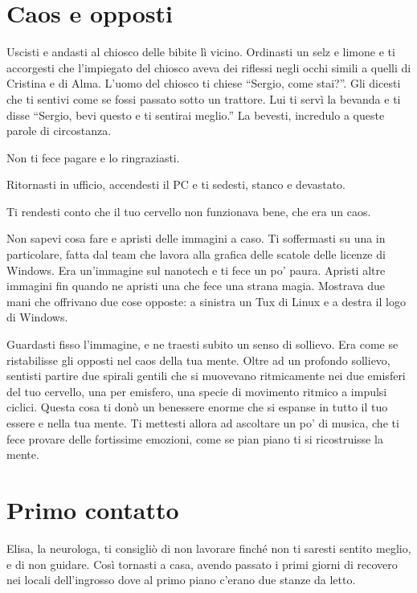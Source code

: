 \section{Caos e opposti}
\label{caos_e_opposti}

Uscisti e andasti al chiosco delle bibite lì vicino. Ordinasti un selz e limone e ti accorgesti che l'impiegato del chiosco aveva dei riflessi negli occhi simili a quelli di Cristina e di Alma. L'uomo del chiosco ti chiese “Sergio, come stai?”. Gli dicesti che ti sentivi come se fossi passato sotto un trattore. Lui ti servì la bevanda e ti disse “Sergio, bevi questo e ti sentirai meglio.” La bevesti, incredulo a queste parole di circostanza.

Non ti fece pagare e lo ringraziasti.

Ritornasti in ufficio, accendesti il PC e ti sedesti, stanco e devastato.

Ti rendesti conto che il tuo cervello non funzionava bene, che era un caos.

Non sapevi cosa fare e apristi delle immagini a caso. Ti soffermasti su una in particolare, fatta dal team che lavora alla grafica delle scatole delle licenze di Windows. Era un'immagine sul nanotech e ti fece un po' paura. Apristi altre immagini fin quando ne apristi una che fece una strana magia. Mostrava due mani che offrivano due cose opposte: a sinistra un Tux di Linux e a destra il logo di Windows.

Guardasti fisso l'immagine, e ne traesti subito un senso di sollievo. Era come se ristabilisse gli opposti nel caos della tua mente. Oltre ad un profondo sollievo, sentisti partire due spirali gentili che si muovevano ritmicamente nei due emisferi del tuo cervello, una per emisfero, una specie di movimento ritmico a impulsi ciclici. Questa cosa ti donò un benessere enorme che si espanse in tutto il tuo essere e nella tua mente. Ti mettesti allora ad ascoltare un po' di musica, che ti fece provare delle fortissime emozioni, come se pian piano ti si ricostruisse la mente.

\section{Primo contatto}
\label{primo_contatto}

Elisa, la neurologa, ti consigliò di non lavorare finché non ti saresti sentito meglio, e di non guidare. Così tornasti a casa, avendo passato i primi giorni di recovero nei locali dell'ingrosso dove al primo piano c'erano due stanze da letto.

